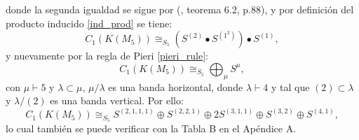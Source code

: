 \documentclass[12pt]{book}
\theoremstyle{definition}
\newcounter{in}
\newcounter{ini}
\begin{document}
donde la segunda igualdad se sigue por \normalfont(\cite{karpilovsky1990induced}, teorema 6.2, p.88), y por definición del producto inducido \ref{ind_prod} se tiene:
\begin{equation}
C_{1}(K(M_{5})) \cong_{S_{5}} (S^{(2)} \bullet S^{(1^{2})}) \bullet S^{(1)}, 
\end{equation}
y nuevamente por la regla de Pieri \ref{pieri_rule}:
\begin{equation}
C_{1}(K(M_{5})) \cong_{S_{5}} \bigoplus_{\mu} S^{\mu}, 
\end{equation}
con $\mu \vdash 5$ y $\lambda \subset \mu$, $\mu / \lambda$ es una
banda horizontal, donde $\lambda \vdash 4$ y tal que $(2) \subset
\lambda$ y $\lambda / (2)$ es una banda vertical. Por ello:
\begin{equation}
C_{1}(K(M_{5})) \cong_{S_{5}} S^{(2,1,1,1)} \oplus S^{(2,2,1)} \oplus 2S^{(3,1,1)} \oplus S^{(3,2)} \oplus S^{(4,1)},
\end{equation}
lo cual también se puede verificar con la Tabla B en el Apéndice A.
\end{document}
